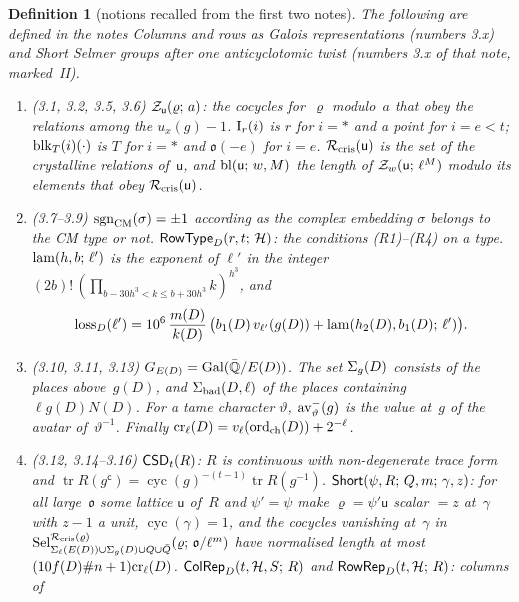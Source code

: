 \documentclass[11pt,a4paper]{article}
\newcommand{\Gal}{\operatorname{Gal}}
\newcommand{\m}[1]{\mbox{$#1$}}        %
\theoremstyle{plainx}
\theoremstyle{uprightx}
\newtheorem{definition}[theorem]{Definition}
\newcommand{\Qb}{\bar{\mathbb{Q}}}
\newcommand{\cyc}{\operatorname{cyc}}
\newcommand{\Sel}[4]{\operatorname{Sel}_{#2}^{#3}(#1;\,#4)}
\newcommand{\pd}[2]{\Sigma_{#2}(#1)}
\newcommand{\cj}[1]{\bar{#1}}
\newcommand{\fo}{\mathfrak{o}}
\newcommand{\HT}{\mathcal{H}}
\newcommand{\tr}{\operatorname{tr}}
\newcommand{\Dm}[1]{m(#1)}
\newcommand{\kD}[1]{k(#1)}
\newcommand{\fD}[1]{f(#1)}
\newcommand{\ED}[1]{E(#1)}
\newcommand{\gD}[1]{g(#1)}
\newcommand{\lvl}[1]{N(#1)}
\newcommand{\hhD}[1]{h_2(#1)}
\newcommand{\bone}[1]{b_1(#1)}
\newcommand{\ordch}[1]{\operatorname{ord}_{\mathrm{ch}}(#1)}
\begin{document}
\begin{definition}[notions recalled from the first two notes]\label{d:recall}
The following are defined in the notes \emph{Columns and rows as Galois representations} (numbers 3.x) and
\emph{Short Selmer groups after one anticyclotomic twist} (numbers 3.x of that note, marked~II).
\begin{enumerate}[label=\textup{(\arabic*)},leftmargin=2.3em,itemsep=2pt]
\item (3.1, 3.2, 3.5, 3.6) \m{\obeyingCocycles{\mathsf{u}}{\varrho}{a}}: the cocycles for~$\varrho$ modulo~$a$ that obey the
relations among the \m{u_x(g)-1}. \m{\RowBlockIndex{r}{i}} is $r$ for \m{i=\ast} and a point for \m{i=e<t};
\m{\blockRep{T}{i}{\cdot}} is $T$ for \m{i=\ast} and \m{\fo(-e)} for \m{i=e}. \m{\crysRels{\mathsf{u}}} is the set of the
crystalline relations of~$\mathsf{u}$, and \m{\blockLoss{\mathsf{u}}{w}{M}} the length of
\m{\obeyingCocycles{w}{\mathsf{u}}{\ell^{M}}} modulo its elements that obey \m{\crysRels{\mathsf{u}}}.
\item (3.7--3.9) \m{\cmSign{\sigma}=\pm1} according as the complex embedding $\sigma$ belongs to the CM type or not.
\m{\IsRowType{D}{r}{t}{\HT}}: the conditions (R1)--(R4) on a type. \m{\lambdaLoss{h}{b}{\ell'}} is the exponent of $\ell'$
in the integer \m{(2b)!\,(\prod_{b-30h^3<k\le b+30h^3}k)^{h^3}}, and
\[
\loss{D}{\ell'}=10^{6}\,\frac{\Dm{D}}{\kD{D}}\,\bigl(\bone{D}\,v_{\ell'}(\gD{D})+\lambdaLoss{\hhD{D}}{\bone{D}}{\ell'}\bigr).
\]
\item (3.10, 3.11, 3.13) \m{\AbsGal{D}=\Gal(\Qb/\ED{D})}. The set \m{\placesAboveG{D}} consists of the places
above~\m{\gD{D}}, and \m{\badPlaces{D}{\ell}} of the places containing \m{\ell\gD{D}\lvl{D}}. For a tame character
$\vartheta$, \m{\invAvatar{\vartheta}{g}} is the value at~$g$ of the avatar of~\m{\vartheta^{-1}}. Finally
\m{\crudeUnit{\ell}{D}=v_\ell(\ordch{D})+2^{-\ell}}.
\item (3.12, 3.14--3.16) \m{\IsConjSelfDual{t}{R}}: $R$ is continuous with non-degenerate trace form and
\m{\tr R(g^{\mathsf c})=\cyc(g)^{-(t-1)}\tr R(g^{-1})}. \m{\SelmerLengthLe{\psi}{R}{Q}{m}{\gamma}{z}}: for all large~$\fo$ some
lattice $\mathsf{u}$ of~$R$ and \m{\psi'=\psi} make \m{\varrho=\psi'\mathsf{u}} scalar \m{=z} at~$\gamma$ with \m{z-1} a unit,
\m{\cyc(\gamma)=1}, and the cocycles vanishing at~$\gamma$ in
\m{\Sel{\varrho}{\pd{\ED{D}}{\ell}\cup\placesAboveG{D}\cup Q\cup\cj{Q}}{\crysRels{\varrho}}{\fo/\ell^{m}}} have normalised length
at most \m{(10\fD{D}\#n+1)\crudeUnit{\ell}{D}}. \m{\IsColumn{D}{t}{\HT}{S}{R}} and \m{\IsRow{D}{t}{\HT}{R}}: columns of

\end{enumerate}
\end{definition}
\end{document}
